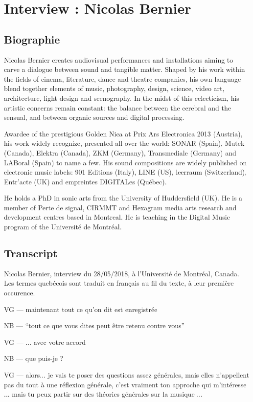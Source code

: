 \chapter{Interview : Nicolas Bernier}
\label{appendix:bernier}

\section*{Biographie}

Nicolas Bernier creates audiovisual performances and installations aiming to carve a dialogue between sound and tangible matter. Shaped by his work within the fields of cinema, literature, dance and theatre companies, his own language blend together elements of music, photography, design, science, video art, architecture, light design and scenography. In the midst of this eclecticism, his artistic concerns remain constant: the balance between the cerebral and the sensual, and between organic sources and digital processing.

Awardee of the prestigious Golden Nica at Prix Ars Electronica 2013 (Austria), his work widely recognize, presented all over the world: SONAR (Spain), Mutek (Canada), Elektra (Canada), ZKM (Germany), Transmediale (Germany) and LABoral (Spain) to name a few. His sound compositions are widely published on electronic music labels: 901 Editions (Italy), LINE (US), leerraum (Switzerland), Entr’acte (UK) and empreintes DIGITALes (Québec).

He holds a PhD in sonic arts from the University of Huddersfield (UK). He is a member of Perte de signal, CIRMMT and Hexagram media arts research and development centres based in Montreal. He is teaching in the Digital Music program of the Université de Montréal. 


\section*{Transcript}

Nicolas Bernier, interview du 28/05/2018, à l'Université de Montréal, Canada.
Les termes quebécois sont traduit en français au fil du texte, à leur première occurence.
 
VG — maintenant tout ce qu'on dit est enregistrée 

NB — ``tout ce que vous dites peut être retenu contre vous'' 

VG — ... avec votre accord 

NB — que puis-je ?

VG — alors... je vais te poser des questions assez générales, mais elles n'appellent pas du tout à une réflexion générale, c'est vraiment ton approche qui m'intéresse ... mais tu peux partir sur des théories générales sur la musique ...

